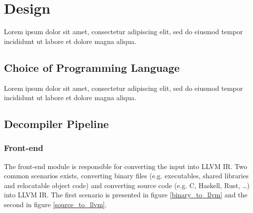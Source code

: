 \documentclass[12pt, a4paper]{article}
\begin{document}
\pagebreak


\section{Design}


Lorem ipsum dolor sit amet, consectetur adipiscing elit, sed do eiusmod tempor incididunt ut labore et dolore magna aliqua.


\subsection{Choice of Programming Language}

Lorem ipsum dolor sit amet, consectetur adipiscing elit, sed do eiusmod tempor incididunt ut labore et dolore magna aliqua.



\subsection{Decompiler Pipeline}


\subsubsection{Front-end}


The front-end module is responsible for converting the input into LLVM IR. Two common scenarios exists, converting binary files (e.g. executables, shared libraries and relocatable object code) and converting source code (e.g. C, Haskell, Rust, …) into LLVM IR. The first scenario is presented in figure \ref{binary_to_llvm} and the second in figure \ref{source_to_llvm}.
\end{document}

